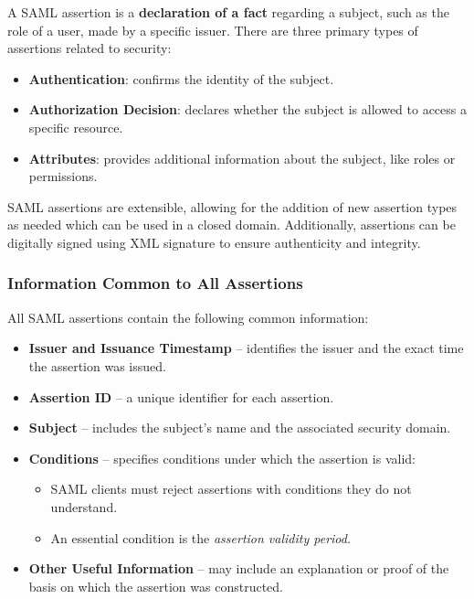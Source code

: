 A SAML assertion is a \textbf{declaration of a fact} regarding a
subject, such as the role of a user, made by a specific issuer. There
are three primary types of assertions related to security:

\begin{itemize}
    \item \textbf{Authentication}: confirms the identity of the
      subject.
    \item \textbf{Authorization Decision}: declares whether the
      subject is allowed to access a specific resource.
    \item \textbf{Attributes}: provides additional information about
      the subject, like roles or permissions.
\end{itemize}

SAML assertions are extensible, allowing for the addition of new
assertion types as needed which can be used in a closed domain.
Additionally, assertions can be digitally signed using XML signature
to ensure authenticity and integrity.

\subsubsection{Information Common to All Assertions}

All SAML assertions contain the following common information:

\begin{itemize}
    \item \textbf{Issuer and Issuance Timestamp} – identifies the
      issuer and the exact time the assertion was issued.
    \item \textbf{Assertion ID} – a unique identifier for each
      assertion.
    \item \textbf{Subject} – includes the subject's name and the
      associated security domain.
    \item \textbf{Conditions} – specifies conditions under which the
      assertion is valid:
    \begin{itemize}
        \item SAML clients must reject assertions with conditions they
          do not understand.
        \item An essential condition is the \textit{assertion validity
          period}.
    \end{itemize}
    \item \textbf{Other Useful Information} – may include an
      explanation or proof of the basis on which the assertion was
      constructed.
\end{itemize}

